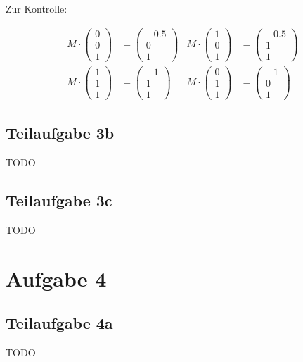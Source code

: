 \documentclass[a4paper]{scrartcl}
\begin{document}
Zur Kontrolle:

\begin{align}
    M \cdot \begin{pmatrix}0\\0\\1\end{pmatrix} &= \begin{pmatrix}-0.5\\0\\1\end{pmatrix}
    & M \cdot \begin{pmatrix}1\\0\\1\end{pmatrix} &= \begin{pmatrix}-0.5\\1\\1\end{pmatrix}\\
    M \cdot \begin{pmatrix}1\\1\\1\end{pmatrix} &= \begin{pmatrix}-1\\1\\1\end{pmatrix}
    & M \cdot \begin{pmatrix}0\\1\\1\end{pmatrix} &= \begin{pmatrix}-1\\0\\1\end{pmatrix}
\end{align}




\subsection*{Teilaufgabe 3b}
TODO
\subsection*{Teilaufgabe 3c}
TODO

\section*{Aufgabe 4}
\subsection*{Teilaufgabe 4a}
TODO
\end{document}

